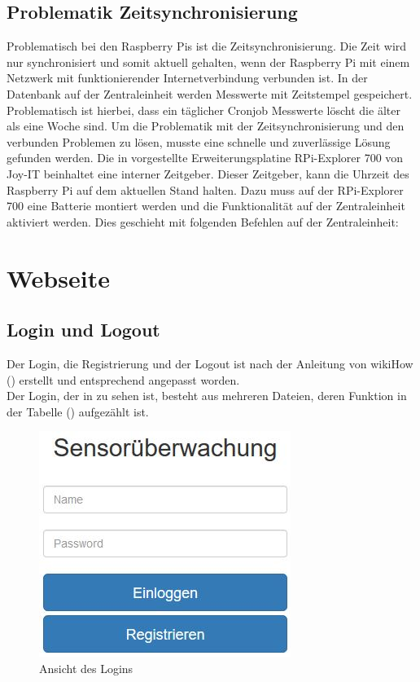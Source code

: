 \subsection{Problematik Zeitsynchronisierung}
Problematisch bei den Raspberry Pis ist die Zeitsynchronisierung. Die Zeit wird nur synchronisiert und somit aktuell gehalten, wenn der Raspberry Pi mit einem Netzwerk mit funktionierender Internetverbindung verbunden ist. In der Datenbank auf der Zentraleinheit werden Messwerte mit Zeitstempel gespeichert. Problematisch ist hierbei, dass ein täglicher Cronjob Messwerte löscht die älter als eine Woche sind. Um die Problematik mit der Zeitsynchronisierung und den verbunden Problemen zu lösen, musste eine schnelle und zuverlässige Lösung gefunden werden. Die in  vorgestellte Erweiterungsplatine RPi-Explorer 700 von Joy-IT beinhaltet eine interner Zeitgeber. Dieser Zeitgeber, kann die Uhrzeit des Raspberry Pi auf dem aktuellen Stand halten. Dazu muss auf der RPi-Explorer 700 eine Batterie montiert werden und die Funktionalität auf der Zentraleinheit aktiviert werden. Dies geschieht mit folgenden Befehlen auf der Zentraleinheit:
 
\section{Webseite}
\subsection{Login und Logout}\label{login}

Der Login, die Registrierung und der Logout ist nach der Anleitung von
wikiHow (\cite{PHP-Login:online}) erstellt und entsprechend angepasst worden. 
\\
Der Login, der in  zu sehen ist, besteht aus mehreren Dateien, deren Funktion in der Tabelle
() aufgezählt ist.

\begin{figure} [htb]
\begin{centering}
\includegraphics{Bilder/Kapitel4/login.jpg}
\caption[Ansicht des Logins]{Ansicht des Logins}
\label{pic:login}
\end{centering}
\end{figure}

